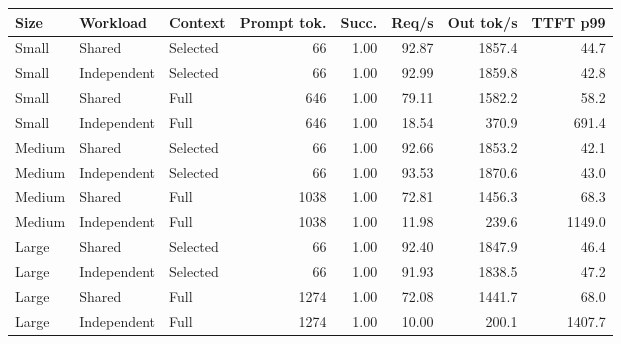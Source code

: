 \begin{tabular}{lllrrrrr}
\toprule
Size & Workload & Context & Prompt tok. & Succ. & Req/s & Out tok/s & TTFT p99 \\
\midrule
Small & Shared & Selected & 66 & 1.00 & 92.87 & 1857.4 & 44.7 \\
Small & Independent & Selected & 66 & 1.00 & 92.99 & 1859.8 & 42.8 \\
Small & Shared & Full & 646 & 1.00 & 79.11 & 1582.2 & 58.2 \\
Small & Independent & Full & 646 & 1.00 & 18.54 & 370.9 & 691.4 \\
Medium & Shared & Selected & 66 & 1.00 & 92.66 & 1853.2 & 42.1 \\
Medium & Independent & Selected & 66 & 1.00 & 93.53 & 1870.6 & 43.0 \\
Medium & Shared & Full & 1038 & 1.00 & 72.81 & 1456.3 & 68.3 \\
Medium & Independent & Full & 1038 & 1.00 & 11.98 & 239.6 & 1149.0 \\
Large & Shared & Selected & 66 & 1.00 & 92.40 & 1847.9 & 46.4 \\
Large & Independent & Selected & 66 & 1.00 & 91.93 & 1838.5 & 47.2 \\
Large & Shared & Full & 1274 & 1.00 & 72.08 & 1441.7 & 68.0 \\
Large & Independent & Full & 1274 & 1.00 & 10.00 & 200.1 & 1407.7 \\
\bottomrule
\end{tabular}

